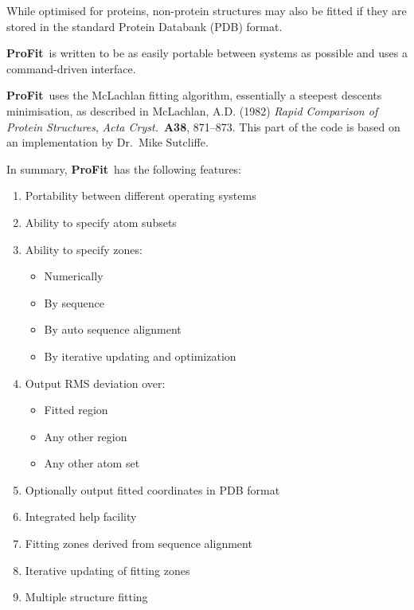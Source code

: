 \documentclass{article}
\newcommand{\pf}{\mbox{\bfseries ProFit}}
\begin{document}
While optimised for proteins, non-protein structures may also be
fitted if they are stored in the standard Protein Databank (PDB) format.

\pf\ is written to be as easily portable between systems as possible
and uses a command-driven interface. 

\pf\ uses the McLachlan fitting algorithm, essentially a steepest
descents minimisation, as described in McLachlan, A.D. (1982)
\emph{Rapid Comparison of Protein Structures}, \emph{Acta Cryst.}\
{\bfseries A38}, 871--873. This part of the code is based on an
implementation by Dr.\ Mike Sutcliffe.


In summary, \pf\ has the following features:

\begin{enumerate}
\setlength{\parsep}{0pt}
\setlength{\parskip}{0pt}
\setlength{\itemsep}{0pt}
\item Portability between different operating systems
\item Ability to specify atom subsets
\item Ability to specify zones:
\begin{itemize}
        \setlength{\parsep}{0pt}
        \setlength{\parskip}{0pt}
        \setlength{\itemsep}{0pt}
        \item Numerically
        \item By sequence
        \item By auto sequence alignment
        \item By iterative updating and optimization
\end{itemize}
\item Output RMS deviation over:
\begin{itemize}
        \setlength{\parsep}{0pt}
        \setlength{\parskip}{0pt}
        \setlength{\itemsep}{0pt}
        \item Fitted region
        \item Any other region
        \item Any other atom set
\end{itemize}
\item Optionally output fitted coordinates in PDB format
\item Integrated help facility
\item Fitting zones derived from sequence alignment
\item Iterative updating of fitting zones
\item Multiple structure fitting
\end{enumerate}
\end{document}

